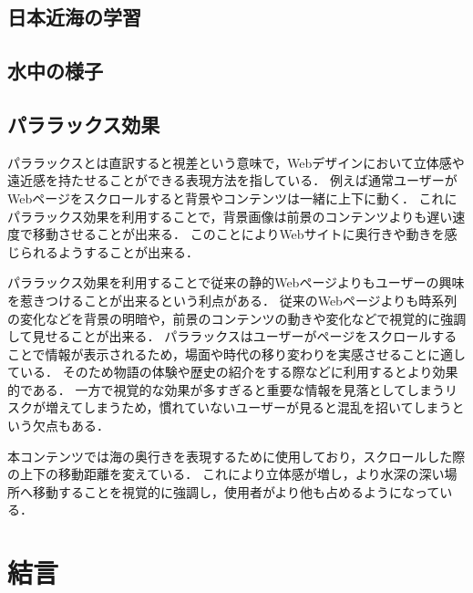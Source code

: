 \documentclass[12pt,a4j,titlepage]{ltjsarticle}
\begin{document}
\subsection{日本近海の学習}

\subsection{水中の様子}
\subsection{パララックス効果}
パララックスとは直訳すると視差という意味で，Webデザインにおいて立体感や遠近感を持たせることができる表現方法を指している．
例えば通常ユーザーがWebページをスクロールすると背景やコンテンツは一緒に上下に動く．
これにパララックス効果を利用することで，背景画像は前景のコンテンツよりも遅い速度で移動させることが出来る．
このことによりWebサイトに奥行きや動きを感じられるようすることが出来る．\par
パララックス効果を利用することで従来の静的Webページよりもユーザーの興味を惹きつけることが出来るという利点がある．
従来のWebページよりも時系列の変化などを背景の明暗や，前景のコンテンツの動きや変化などで視覚的に強調して見せることが出来る．
パララックスはユーザーがページをスクロールすることで情報が表示されるため，場面や時代の移り変わりを実感させることに適している．
そのため物語の体験や歴史の紹介をする際などに利用するとより効果的である．
一方で視覚的な効果が多すぎると重要な情報を見落としてしまうリスクが増えてしまうため，慣れていないユーザーが見ると混乱を招いてしまうという欠点もある．\par
本コンテンツでは海の奥行きを表現するために使用しており，スクロールした際の上下の移動距離を変えている．
これにより立体感が増し，より水深の深い場所へ移動することを視覚的に強調し，使用者がより他も占めるようになっている．

\clearpage

\section{結言}\label{結言}
\clearpage
\end{document}
